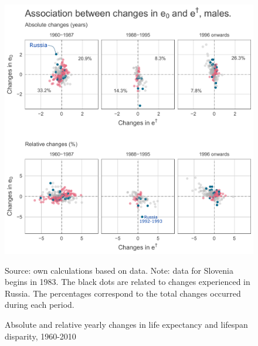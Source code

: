 \documentclass{article}
\begin{document}
\begin{figure}[h!]
\centering
\caption{Absolute and relative yearly changes in life expectancy and lifespan disparity, 1960-2010}
\label{Abs_changes}
\begin{center}
\includegraphics[scale=.65]{Figures/changes_males.pdf}
\end{center}
Source: own calculations based on \citet{HMD} data. Note: data for Slovenia begins in 1983. The black dots are related to changes experienced in Russia. The percentages correspond to the total changes occurred during each period.
\end{figure}

\newpage
\end{document}
